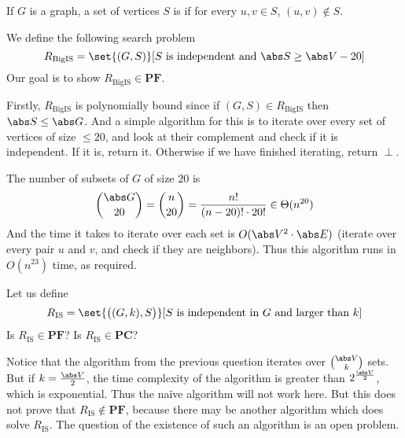 \documentclass[10pt]{article}
\def\PF{\mathbf{PF}}
\def\PC{\mathbf{PC}}
\begin{document}


\bigskip

\begin{defn}

    If $G$ is a graph, a set of vertices $S$ is  if for every $u,v\in S$, $(u,v)\notin S$.

\end{defn}

\def\Rbigis{R_{\text{BigIS}}}
\begin{exercise*}

    We define the following search problem
    \[ \Rbigis = \set{(G,S)}[\text{$S$ is independent and $\abs S\geq\abs V-20$}] \]
    Our goal is to show $\Rbigis\in\PF$.

\end{exercise*}

Firstly, $\Rbigis$ is polynomially bound since if $(G,S)\in\Rbigis$ then $\abs S\leq\abs G$.
And a simple algorithm for this is to iterate over every set of vertices of size $\leq20$, and look at their complement and check if it is independent.
If it is, return it.
Otherwise if we have finished iterating, return $\perp$.

The number of subsets of $G$ of size $20$ is
\[ \binom{\abs G}{20} = \binom n{20} = \frac{n!}{(n-20)!\cdot20!} \in \Theta(n^{20}) \]
And the time it takes to iterate over each set is $O(\abs V^2\cdot\abs E)$ (iterate over every pair $u$ and $v$, and check if they are neighbors).
Thus this algorithm runs in $O(n^{23})$ time, as required.

\def\Ris{R_{\text{IS}}}
\begin{exercise*}

    Let us define
    \[ \Ris = \set{\bigl((G,k),S\bigr)}[\text{$S$ is independent in $G$ and larger than $k$}] \]
    Is $\Ris\in\PF$?
    Is $\Ris\in\PC$?

\end{exercise*}

\benum
    \item Notice that the algorithm from the previous question iterates over $\binom{\abs V}k$ sets.
    But if $k=\frac{\abs V}2$, the time complexity of the algorithm is greater than $2^{\frac{\abs V}2}$, which is exponential.
    Thus the na\"ive algorithm will not work here.
    But this does not prove that $\Ris\notin\PF$, because there may be another algorithm which does solve $\Ris$.
    The question of the existence of such an algorithm is an open problem.
\end{document}
